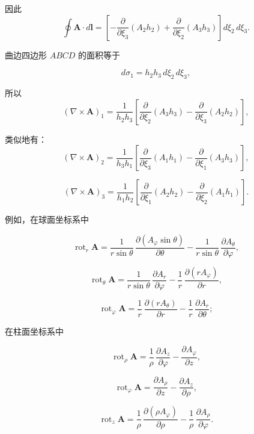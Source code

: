 \documentclass[11pt,a4paper,oneside]{ctexbook}
\newcommand{\ve}[1]{\bm{#1}}
\begin{document}
因此
\begin{equation*}
\oint \ve{A} \cdot d\ve{l} = \left[-\frac{\partial}{\partial\xi_3} (A_2 h_2) + \frac{\partial}{\partial\xi_2} (A_3 h_3)\right] d\xi_2\, d\xi_3.
\end{equation*}

曲边四边形 $ABCD$ 的面积等于

\begin{equation*}
d\sigma_1 = h_2 h_3\, d\xi_2\, d\xi_3,
\end{equation*}

所以
\begin{equation*}
(\nabla \times \ve{A})_1 = \frac{1}{h_2 h_3} \left[ \frac{\partial}{\partial\xi_2} (A_3 h_3) - \frac{\partial}{\partial\xi_3} (A_2 h_2) \right],
\end{equation*}

类似地有：
\begin{equation*}
(\nabla \times \ve{A})_2 = \frac{1}{h_3 h_1} \left[ \frac{\partial}{\partial\xi_3} (A_1 h_1) - \frac{\partial}{\partial\xi_1} (A_3 h_3) \right],
\end{equation*}

\begin{equation*}
(\nabla \times \ve{A})_3 = \frac{1}{h_1 h_2} \left[ \frac{\partial}{\partial\xi_1} (A_2 h_2) - \frac{\partial}{\partial\xi_2} (A_1 h_1) \right].
\end{equation*}

例如，在球面坐标系中

\begin{equation*}
\operatorname{rot}_r \ve{A} = \frac{1}{r\sin\theta}\, \frac{\partial (A_\varphi \sin\theta)}{\partial\theta} - \frac{1}{r\sin\theta}\, \frac{\partial A_\theta}{\partial\varphi},
\end{equation*}

\begin{equation*}
\operatorname{rot}_\theta \ve{A} = \frac{1}{r\sin\theta}\, \frac{\partial A_r}{\partial\varphi} - \frac{1}{r}\, \frac{\partial (r A_\varphi)}{\partial r},
\end{equation*}

\begin{equation*}
\operatorname{rot}_\varphi \ve{A} = \frac{1}{r}\, \frac{\partial (r A_\theta)}{\partial r} - \frac{1}{r}\, \frac{\partial A_r}{\partial\theta};
\end{equation*}

在柱面坐标系中

\begin{equation*}
\operatorname{rot}_\rho \ve{A} = \frac{1}{\rho}\, \frac{\partial A_z}{\partial\varphi} - \frac{\partial A_\varphi}{\partial z},
\end{equation*}

\begin{equation*}
\operatorname{rot}_\varphi \ve{A} = \frac{\partial A_\rho}{\partial z} - \frac{\partial A_z}{\partial\rho},
\end{equation*}

\begin{equation*}
\operatorname{rot}_z \ve{A} = \frac{1}{\rho}\, \frac{\partial (\rho A_\varphi)}{\partial\rho} - \frac{1}{\rho}\, \frac{\partial A_\rho}{\partial\varphi}.
\end{equation*}
\end{document}
